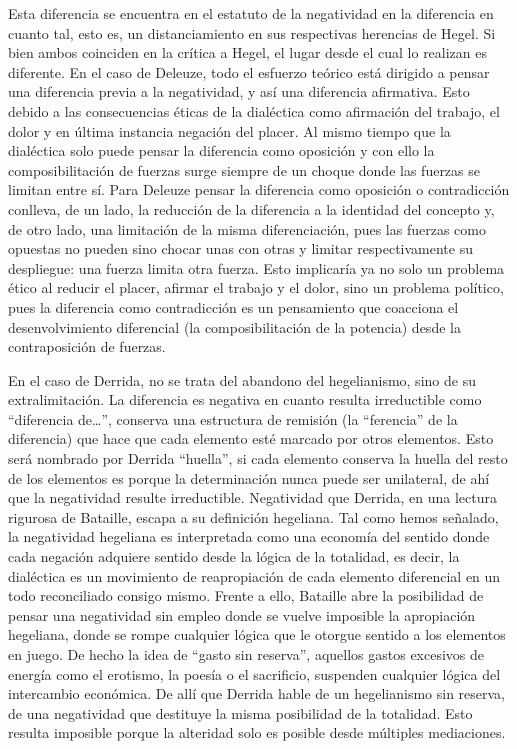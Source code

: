 \documentclass{book}
\begin{document}
Esta diferencia se encuentra en el estatuto de la negatividad en la
diferencia en cuanto tal, esto es, un distanciamiento en sus respectivas
herencias de Hegel. Si bien ambos coinciden en la crítica a Hegel, el
lugar desde el cual lo realizan es diferente. En el caso de Deleuze,
todo el esfuerzo teórico está dirigido a pensar una diferencia previa a
la negatividad, y así una diferencia afirmativa. Esto debido a las
consecuencias éticas de la dialéctica como afirmación del trabajo, el
dolor y en última instancia negación del placer. Al mismo tiempo que la
dialéctica solo puede pensar la diferencia como oposición y con ello la
composibilitación de fuerzas surge siempre de un choque donde las
fuerzas se limitan entre sí. Para Deleuze pensar la diferencia como
oposición o contradicción conlleva, de un lado, la reducción de la
diferencia a la identidad del concepto y, de otro lado, una limitación
de la misma diferenciación, pues las fuerzas como opuestas no pueden
sino chocar unas con otras y limitar respectivamente su despliegue: una
fuerza limita otra fuerza. Esto implicaría ya no solo un problema ético
al reducir el placer, afirmar el trabajo y el dolor, sino un problema
político, pues la diferencia como contradicción es un pensamiento que
coacciona el desenvolvimiento diferencial (la composibilitación de la
potencia) desde la contraposición de fuerzas.

En el caso de Derrida, no se trata del abandono del hegelianismo, sino
de su extralimitación. La diferencia es negativa en cuanto resulta
irreductible como \enquote{diferencia de\ldots}, conserva una estructura de
remisión (la \enquote{ferencia} de la diferencia) que hace que cada elemento
esté marcado por otros elementos. Esto será nombrado por Derrida
\enquote{huella}, si cada elemento conserva la huella del resto de los elementos
es porque la determinación nunca puede ser unilateral, de ahí que la
negatividad resulte irreductible. Negatividad que Derrida, en una
lectura rigurosa de Bataille, escapa a su definición hegeliana. Tal como
hemos señalado, la negatividad hegeliana es interpretada como una
economía del sentido donde cada negación adquiere sentido desde la
lógica de la totalidad, es decir, la dialéctica es un movimiento de
reapropiación de cada elemento diferencial en un todo reconciliado
consigo mismo. Frente a ello, Bataille abre la posibilidad de pensar una
negatividad sin empleo donde se vuelve imposible la apropiación
hegeliana, donde se rompe cualquier lógica que le otorgue sentido a los
elementos en juego. De hecho la idea de \enquote{gasto sin reserva}, aquellos
gastos excesivos de energía como el erotismo, la poesía o el sacrificio,
suspenden cualquier lógica del intercambio económica. De allí que
Derrida hable de un hegelianismo sin reserva, de una negatividad que
destituye la misma posibilidad de la totalidad. Esto resulta imposible
porque la alteridad solo es posible desde múltiples mediaciones.
\end{document}

